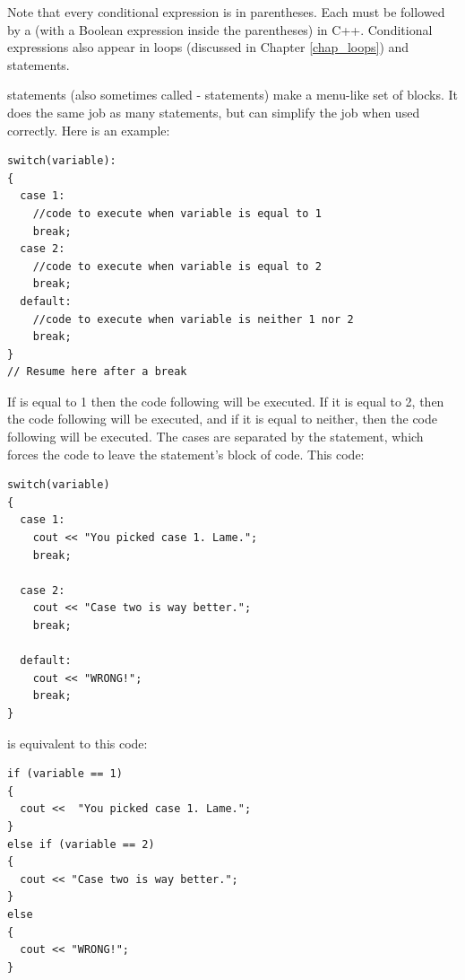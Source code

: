 Note that every conditional expression is in parentheses.
Each  must be followed by a  (with a Boolean expression inside the parentheses) in C++.
Conditional expressions also appear in loops (discussed in Chapter \ref{chap_loops}) and  statements.


 statements (also sometimes called - statements) make a menu-like set of blocks. 
It does the same job as many  statements, but can simplify the job when used correctly. 
Here is an example:

\noindent\begin{minipage}{\linewidth}\begin{lstlisting}
switch(variable):
{
  case 1:
    //code to execute when variable is equal to 1
    break;
  case 2:
    //code to execute when variable is equal to 2
    break;
  default:
    //code to execute when variable is neither 1 nor 2
    break;
}
// Resume here after a break
\end{lstlisting}\end{minipage}

If  is equal to 1 then the code following  will be executed.
If it is equal to 2, then the code following  will be executed, and if it is equal to neither, then the code following  will be executed. 
The cases are separated by the  statement, which forces the code to leave the  statement's block of code. This code: \nopagebreak[4]

\noindent\begin{minipage}{\linewidth}\begin{lstlisting}
switch(variable)
{
  case 1:
    cout << "You picked case 1. Lame.";
    break;

  case 2:
    cout << "Case two is way better.";
    break;

  default:
    cout << "WRONG!";
    break;
}
\end{lstlisting}\end{minipage}

\noindent is equivalent to this code: \nopagebreak[4]

\noindent\begin{minipage}{\linewidth}\begin{lstlisting}
if (variable == 1)
{
  cout <<  "You picked case 1. Lame.";
}
else if (variable == 2)
{
  cout << "Case two is way better.";
}
else
{
  cout << "WRONG!";
}
\end{lstlisting}\end{minipage}

